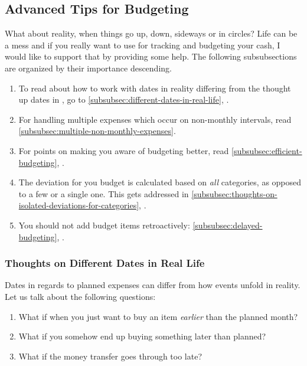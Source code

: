 \subsection{Advanced Tips for Budgeting}
\label{subsec:advanced-tips-for-budgeting}

What about reality, when things go up, down, sideways or in circles?
Life can be a mess and if you really want to use \tfn for tracking and budgeting your cash, I would like to support that by providing some help.
The following subsubsections are organized by their importance descending.
\begin{enumerate}
	\item To read about how to work with dates in reality differing from the thought up dates in \tfn, go to \autoref{subsubsec:different-dates-in-real-life}, .
	\item For handling multiple expenses which occur on non-monthly intervals, read \autoref{subsubsec:multiple-non-monthly-expenses}.
	\item For points on making you aware of budgeting better, read \autoref{subsubsec:efficient-budgeting}, .
	\item The deviation for you budget is calculated based on \emph{all} categories, as opposed to a few or a single one.
	This gets addressed in \autoref{subsubsec:thoughts-on-isolated-deviations-for-categories}, .
	\item You should not add budget items retroactively: 	\autoref{subsubsec:delayed-budgeting}, .
\end{enumerate}

\subsubsection{Thoughts on Different Dates in Real Life}
\label{subsubsec:different-dates-in-real-life}

Dates in regards to planned expenses can differ from how events unfold in reality.
Let us talk about the following questions:
\begin{enumerate}
	\item What if when you just want to buy an item \emph{earlier} than the planned month?
	\item What if you somehow end up buying something later than planned?
	\item What if the money transfer goes through too late?
\end{enumerate}

